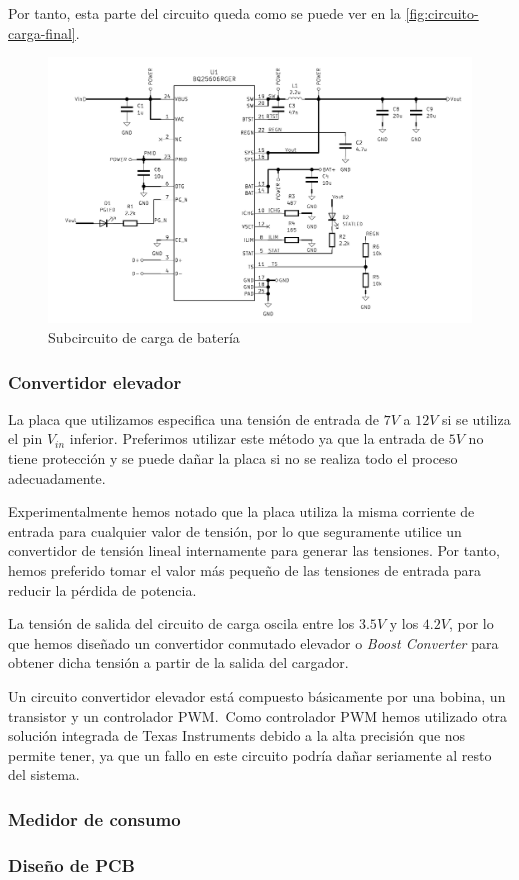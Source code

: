 Por tanto, esta parte del circuito queda como se puede ver en la \autoref{fig:circuito-carga-final}.

\begin{figure}[h]
    \centering
    \includegraphics[width=\textwidth]{images/2/2-1/circuitoCarga.png}
    \caption{Subcircuito de carga de batería}
    \label{fig:circuito-carga-final}
\end{figure}

\subsubsection{Convertidor elevador}\label{subsubsec:convertidor_elevador}

La placa que utilizamos especifica una tensión de entrada de $7 V$ a $12 V$ si se utiliza el pin $V_{in}$ inferior. Preferimos utilizar este método ya que la entrada de $5 V$ no tiene protección y se puede dañar la placa si no se realiza todo el proceso adecuadamente.

Experimentalmente hemos notado que la placa utiliza la misma corriente de entrada para cualquier valor de tensión, por lo que seguramente utilice un convertidor de tensión lineal internamente para generar las tensiones. Por tanto, hemos preferido tomar el valor más pequeño de las tensiones de entrada para reducir la pérdida de potencia.

La tensión de salida del circuito de carga oscila entre los $3.5 V$ y los $4.2 V$, por lo que hemos diseñado un convertidor conmutado elevador o \textit{Boost Converter} para obtener dicha tensión a partir de la salida del cargador.

Un circuito convertidor elevador está compuesto básicamente por una bobina, un transistor y un controlador PWM.\ Como controlador PWM hemos utilizado otra solución integrada de Texas Instruments debido a la alta precisión que nos permite tener, ya que un fallo en este circuito podría dañar seriamente al resto del sistema. 

\subsubsection{Medidor de consumo}
\subsubsection{Diseño de PCB}